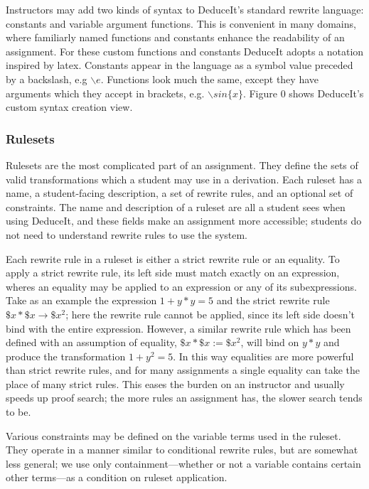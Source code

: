 \documentclass{sigchi}
\begin{document}
Instructors may add two kinds of syntax to DeduceIt's standard rewrite language: constants and variable argument functions. This is convenient in many domains, where familiarly named functions and constants enhance the readability of an assignment. For these custom functions and constants DeduceIt adopts a notation inspired by latex. Constants appear in the language as a symbol value preceded by a backslash, e.g $\backslash{}e$. Functions look much the same, except they have arguments which they accept in brackets, e.g. $\backslash{}sin\{x\}$. Figure 0 shows DeduceIt's custom syntax creation view.


\subsubsection{Rulesets}

Rulesets are the most complicated part of an assignment. They define the sets of valid transformations which a student may use in a derivation. Each ruleset has a name, a student-facing description, a set of rewrite rules, and an optional set of constraints. The name and description of a ruleset are all a student sees when using DeduceIt, and these fields  make an assignment more accessible; students do not need to understand rewrite rules to use the system.

Each rewrite rule in a ruleset is either a strict rewrite rule or an equality. To apply a strict rewrite rule, its left side must match exactly on an expression, wheres an equality may be applied to an expression or any of its subexpressions. Take as an example the expression $1+y*y=5$ and the strict rewrite rule $\$x*\$x \rightarrow \$x^2$; here the rewrite rule cannot be applied, since its left side doesn't bind with the entire expression. However, a similar rewrite rule which has been defined with an assumption of equality, $\$x*\$x := \$x^2$, will bind on $y*y$ and produce the transformation $1+y^2=5$. In this way equalities are more powerful than strict rewrite rules, and for many assignments a single equality can take the place of many strict rules. This eases the burden on an instructor and usually speeds up proof search; the more rules an assignment has, the slower search tends to be.

Various constraints may be defined on the variable terms used in the ruleset. They operate in a manner similar to conditional rewrite rules, but are somewhat less general; we use only containment---whether or not a variable contains certain other terms---as a condition on ruleset application.
\end{document}
